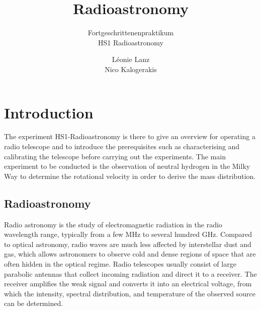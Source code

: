 \documentclass[10pt,a4paper, bibliography=totoc]{scrartcl}
\begin{document}

\title{Radioastronomy}
\subtitle{Fortgeschrittenenpraktikum\\ HS1 Radioastronomy}
\author{Léonie Lanz \\ Nico Kalogerakis}
\maketitle
\newpage

\tableofcontents
\vfill
\newpage


\section{Introduction}
The experiment HS1-Radioastronomy is there to give an overview for operating a radio telescope and to introduce the prerequisites such as characterising and calibrating the telescope before carrying out the experiments. The main experiment to be conducted is the observation of neutral hydrogen in the Milky Way to determine the rotational velocity in order to derive the mass distribution.

\subsection{Radioastronomy}

Radio astronomy is the study of electromagnetic radiation in the radio wavelength range, typically from a few MHz to several hundred GHz. Compared to optical astronomy, radio waves are much less affected by interstellar dust and gas, which allows astronomers to observe cold and dense regions of space that are often hidden in the optical regime. Radio telescopes usually consist of large parabolic antennas that collect incoming radiation and direct it to a receiver. The receiver amplifies the weak signal and converts it into an electrical voltage, from which the intensity, spectral distribution, and temperature of the observed source can be determined.
\end{document}
